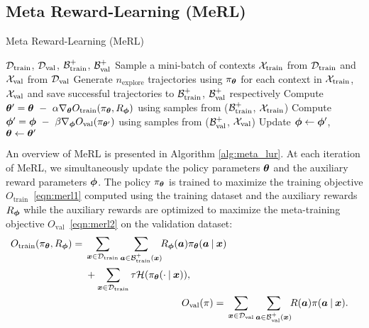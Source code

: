 \subsection{Meta Reward-Learning (MeRL)}
\begin{algorithm}[t]
   \caption{Meta Reward-Learning (MeRL)}
   \label{alg:meta_lur}
\begin{algorithmic}
   $\mathcal{D}_{\mathrm{train}}$, $ \mathcal{D}_{\mathrm{val}}$, $\mathcal{B}^{+}_{\mathrm{train}}$, $\mathcal{B}^{+}_{\mathrm{val}}$
   \STATE Sample a mini-batch of contexts $\mathcal{X}_{\mathrm{train}}$ from $\mathcal{D}_{\mathrm{train}}$ and $\mathcal{X}_{\mathrm{val}}$ from $\mathcal{D}_{\mathrm{val}}$
   \STATE Generate $n_{\mathrm{explore}}$ trajectories using $\pi_{{\bm{\theta}}}$ for each context in $ \mathcal{X}_{\mathrm{train}}$, $ \mathcal{X}_{\mathrm{val}}$ and save successful trajectories to $\mathcal{B}^{+}_{\mathrm{train}}$, $\mathcal{B}^{+}_{\mathrm{val}}$ respectively
   \STATE Compute $ {\bm{\theta}}^{\prime} = {\bm{\theta}} \ -\ \alpha \nabla_{{\bm{\theta}}} O_{\mathrm{train}}(\pi_{{\bm{\theta}}}, R_{{\bm{\phi}}})$ using samples from ($\mathcal{B}^{+}_{\mathrm{train}}$, $\mathcal{X}_{\mathrm{train}}$)
   \STATE Compute $ {\bm{\phi}}^{\prime} =  {\bm{\phi}}\ -\ \beta \nabla_{{\bm{\phi}}} O_{\mathrm{val}}(\pi_{{\bm{\theta}}^{\prime}})$ using samples from ($\mathcal{B}^{+}_{\mathrm{val}}$, $\mathcal{X}_{\mathrm{val}}$)
   \STATE Update ${\bm{\phi}} \leftarrow {\bm{\phi}}^{\prime}$, ${\bm{\theta}} \leftarrow {\bm{\theta}}^{\prime}$
  \ENDFOR
\end{algorithmic}
\end{algorithm}
An overview of MeRL is presented in Algorithm \ref{alg:meta_lur}. At each iteration of MeRL,
we simultaneously update the policy parameters ${\bm{\theta}}$ and the auxiliary reward parameters ${\bm{\phi}}$.
The policy $\pi_{\bm{\theta}}$ is trained to maximize the training objective $O_{\mathrm{train}}$~\eqref{eqn:merl1} computed using the training dataset
and the auxiliary rewards $R_{{\bm{\phi}}}$ while the auxiliary rewards are optimized to maximize the meta-training objective $O_{\mathrm{val}}$~\eqref{eqn:merl2}
on the validation dataset:
\begin{align}
  \begin{split}
  O_{\mathrm{train}}(\pi_{\vtheta}, R_{\vphi}) ={}& \sum_{\vx \in \setDT}\sum_{\vy \in \setBpT(\vx)}\!\! R_{\vphi}(\vy) \pi_{\vtheta}(\vy \mid \vx)\\
                                                  & + \sum_{\vx \in \setDT} \tau {\mathcal H}(\pi_{\vtheta}(\cdot \mid \vx))\label{eqn:merl1}
,
  \end{split}
  \raisetag{3\normalbaselineskip}\\
  O_{\mathrm{val}}(\pi) ={}& \sum_{\vx \in \setDV}\sum_{\vy \in \setBpV(\vx)}\!\! R(\vy) \pi(\vy \mid \vx)\label{eqn:merl2}
.
\end{align}

